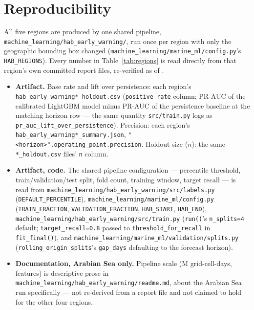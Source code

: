 \documentclass[runningheads]{llncs}
\begin{document}


\section*{Reproducibility}
All five regions are produced by one shared pipeline,
\texttt{machine\_learning/hab\_early\_warning/}, run once per region with
only the geographic bounding box changed
(\texttt{machine\_learning/marine\_ml/config.py}'s \texttt{HAB\_REGIONS}).
Every number in Table~\ref{tab:regions} is read directly from that region's
own committed report files, re-verified as of \AsOf{}.
{\raggedright\sloppy
\begin{itemize}\itemsep1pt\parskip0pt
\item[] \textbf{Artifact.} Base rate and lift over persistence: each
region's \texttt{hab\_early\_warning\allowbreak{}*\_holdout.csv}
(\texttt{positive\_rate} column; PR-AUC of the calibrated LightGBM model
minus PR-AUC of the persistence baseline at the matching horizon row --- the
same quantity \texttt{src/train.py} logs as
\texttt{pr\_auc\_lift\_over\_persistence}). Precision: each region's
\texttt{hab\_early\_warning\allowbreak{}*\_summary.json},
\texttt{"<horizon>"\allowbreak{}.operating\_point.precision}. Holdout size
($n$): the same \texttt{*\_holdout.csv} files' \texttt{n} column.
\item[] \textbf{Artifact, code.} The shared pipeline configuration ---
percentile threshold, train/validation/test split, fold count, training
window, target recall --- is read from
\texttt{machine\_learning/hab\_early\_warning/\allowbreak{}src/labels.py}
(\texttt{DEFAULT\_PERCENTILE}),
\texttt{machine\_learning/marine\_ml/\allowbreak{}config.py}
(\texttt{TRAIN\_FRACTION}, \texttt{VALIDATION\_FRACTION}, \texttt{HAB\_START},
\texttt{HAB\_END}),
\texttt{machine\_learning/hab\_early\_warning/\allowbreak{}src/train.py}
(\texttt{run()}'s \texttt{n\_splits=4} default;
\texttt{target\_recall=0.8} passed to \texttt{threshold\_for\_recall} in
\texttt{fit\_final()}), and
\texttt{machine\_learning/marine\_ml/\allowbreak{}validation/splits.py}
(\texttt{rolling\_origin\_splits}'s \texttt{gap\_days} defaulting to the
forecast horizon).
\item[] \textbf{Documentation, Arabian Sea only.} Pipeline scale
(\HabArabianGridCellDays{}M grid-cell-days, \HabArabianFeatureCount{}
features) is descriptive prose in
\texttt{machine\_learning/hab\_early\_warning/\allowbreak{}readme.md}, about
the Arabian Sea run specifically --- not re-derived from a report file and
not claimed to hold for the other four regions.
\end{itemize}}



\end{document}
